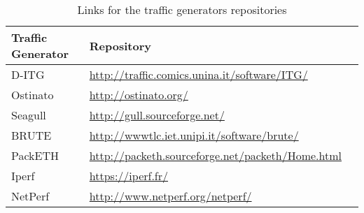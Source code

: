 \sloppy
\begin{table}[ht!]
\centering
\sloppy
\caption{Links for the traffic generators repositories}
\label{tab:traffic-gen-links}
\begin{tabularx}{\textwidth}{@{}ll@{} p{10.0cm}}
\toprule
\sloppy
Traffic Generator       & Repository                                                                                                                                                                                                                \\ \midrule
D-ITG                   & \href{http://traffic.comics.unina.it/software/ITG/}{http://traffic.comics.unina.it/software/ITG/}                                                                                                                         \\
Ostinato                & \href{http://ostinato.org/}{http://ostinato.org/}                                                                                                                                                                         \\
Seagull                 & \href{http://gull.sourceforge.net/}{http://gull.sourceforge.net/}                                                                                                                                                         \\
BRUTE                   & \href{http://wwwtlc.iet.unipi.it/software/brute/ }{http://wwwtlc.iet.unipi.it/software/brute/ }                                                                                                                           \\
PackETH                 & \href{http://packeth.sourceforge.net/packeth/Home.html}{http://packeth.sourceforge.net/packeth/Home.html}                                                                                                                 \\
Iperf                   & \href{https://iperf.fr/}{https://iperf.fr/}                                                                                                                                                                               \\
NetPerf                 & \href{http://www.netperf.org/netperf/}{http://www.netperf.org/netperf/}                                                                                                                                                   \\

\end{tabularx}
\end{table}
